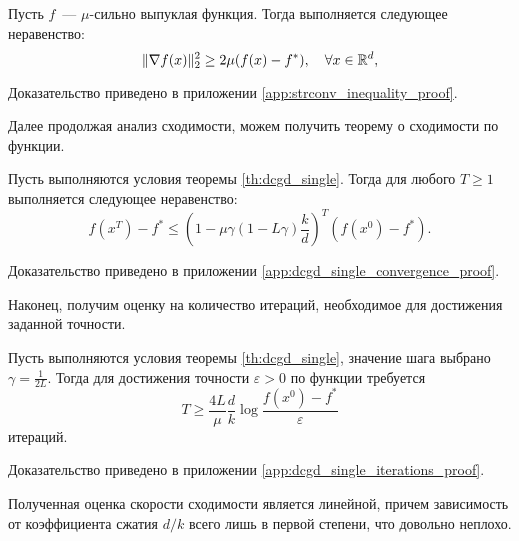    \begin{lemma}\label{lem:strconv_inequality}
        Пусть $f$~--- $\mu$-сильно выпуклая функция. Тогда выполняется следующее неравенство:
        \begin{equation}\label{eq:strconv_inequality}
            \|\nabla f(x)\|_2^2 \geq 2\mu (f(x) - f^*), \quad \forall x \in \mathbb{R}^d,
        \end{equation}
    \end{lemma}
    Доказательство приведено в приложении \ref{app:strconv_inequality_proof}.

    Далее продолжая анализ сходимости, можем получить теорему о сходимости по функции.

    \begin{theorem}\label{th:dcgd_single_convergence}
        Пусть выполняются условия теоремы \ref{th:dcgd_single}. Тогда для любого $T \geq 1$ выполняется следующее неравенство:
        \begin{equation}
            f(x^T) - f^* \leq \left(1 - \mu \gamma \left(1 - L \gamma\right) \frac{k}{d} \right)^T (f(x^0) - f^*).
        \end{equation}
    \end{theorem}
    Доказательство приведено в приложении \ref{app:dcgd_single_convergence_proof}.

    Наконец, получим оценку на количество итераций, необходимое для достижения заданной точности.
    \begin{corollary}\label{cor:dcgd_single_iterations}
        Пусть выполняются условия теоремы \ref{th:dcgd_single}, значение шага выбрано $\gamma = \frac{1}{2L}$. Тогда для достижения точности $\varepsilon > 0$ по функции требуется
        \begin{equation}
            T \geq \frac{4L}{\mu} \frac{d}{k} \log \frac{f(x^0) - f^*}{\varepsilon}
        \end{equation}
        итераций.
    \end{corollary}
    Доказательство приведено в приложении \ref{app:dcgd_single_iterations_proof}.

    Полученная оценка скорости сходимости является линейной, причем зависимость от коэффициента сжатия $d/k$ всего лишь в первой степени, что довольно неплохо.

